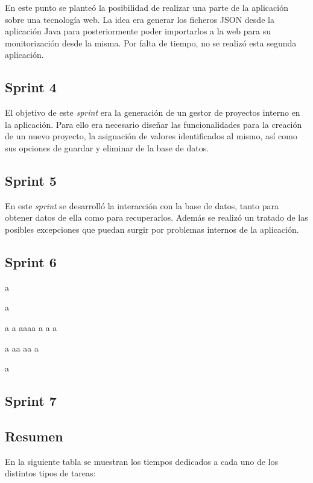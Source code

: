 En este punto se planteó la posibilidad de realizar una parte de la aplicación sobre una tecnología web. La idea era generar los ficheros JSON desde la aplicación Java para posteriormente poder importarlos a la web para su monitorización desde la misma. Por falta de tiempo, no se realizó esta segunda aplicación.


\subsection{Sprint 4}

El objetivo de este \emph{sprint} era la generación de un gestor de proyectos interno en la aplicación. Para ello era necesario diseñar las funcionalidades para la creación de un nuevo proyecto, la asignación de valores identificados al mismo, así como sus opciones de guardar y eliminar de la base de datos.


\subsection{Sprint 5}

En este \emph{sprint} se desarrolló la interacción con la base de datos, tanto para obtener datos de ella como para recuperarlos. Además se realizó un tratado de las posibles excepciones que puedan surgir por problemas internos de la aplicación.


\subsection{Sprint 6}


a

a


a
a
aaaa
a
a
a

a
aa
aa
a

a




\subsection{Sprint 7}


\subsection{Resumen}

En la siguiente tabla se muestran los tiempos dedicados a cada uno de los distintos tipos de tareas:



